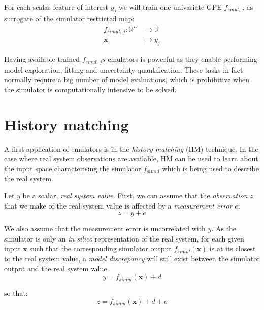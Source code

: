 \vspace{0.2cm}
For each scalar feature of interest $y_j$ we will train one univariate GPE $f_{emul,\,j}$ as surrogate of the simulator restricted map:
%
\begin{align}\label{eq:univariatesimulator}
    f_{simul,\,j}\colon\mathbb{R}^{D} &\to \mathbb{R} \\
    \mathbf{x} &\mapsto y_j \nonumber
\end{align}

\noindent
Having available trained $f_{emul,\,j}s$ emulators is powerful as they enable performing model exploration, fitting and uncertainty quantification. These tasks in fact normally require a big number of model evaluations, which is prohibitive when the simulator is computationally intensive to be solved.


%
%
%
\section{History matching}\label{sec:ch3historymatching}
A first application of emulators is in the \textit{history matching} (\acs{HM}) technique. In the case where real system observations are available, HM can be used to learn about the input space characterising the simulator $f_{simul}$ which is being used to describe the real system.

\vspace{0.2cm}
Let $y$ be a scalar, \textit{real system value}. First, we can assume that the \textit{observation} $z$ that we make of the real system value is affected by a \textit{measurement error} $e$:
%
\begin{equation}
z = y + e
\end{equation}

\noindent
We also assume that the measurement error is uncorrelated with $y$. As the simulator is only an \textit{in silico} representation of the real system, for each given input $\mathbf{x}$ such that the corresponding simulator output $f_{simul}(\mathbf{x})$ is at its closest to the real system value, a \textit{model discrepancy} will still exist between the simulator output and the real system value
%
\begin{equation}
y = f_{simul}(\mathbf{x}) + d
\end{equation}

\noindent
so that:
%
\begin{equation}
z = f_{simul}(\mathbf{x}) + d + e
\end{equation}

